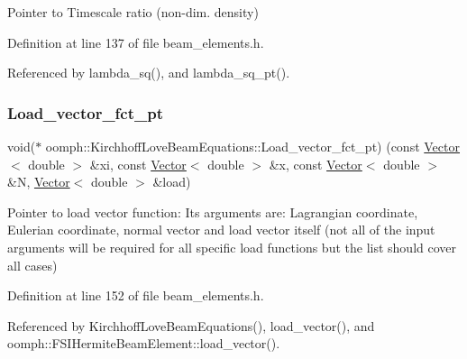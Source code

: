 Pointer to Timescale ratio (non-\/dim. density) 



Definition at line 137 of file beam\+\_\+elements.\+h.



Referenced by lambda\+\_\+sq(), and lambda\+\_\+sq\+\_\+pt().

\mbox{\label{classoomph_1_1KirchhoffLoveBeamEquations_a66707c32b8a08bcf6e8ed855066f9618}} 
\subsubsection{\texorpdfstring{Load\+\_\+vector\+\_\+fct\+\_\+pt}{Load\_vector\_fct\_pt}}
{\footnotesize\ttfamily void($\ast$ oomph\+::\+Kirchhoff\+Love\+Beam\+Equations\+::\+Load\+\_\+vector\+\_\+fct\+\_\+pt) (const \hyperlink{classoomph_1_1Vector}{Vector}$<$ double $>$ \&xi, const \hyperlink{classoomph_1_1Vector}{Vector}$<$ double $>$ \&x, const \hyperlink{classoomph_1_1Vector}{Vector}$<$ double $>$ \&N, \hyperlink{classoomph_1_1Vector}{Vector}$<$ double $>$ \&load)\hspace{0.3cm}{\ttfamily [protected]}}



Pointer to load vector function\+: Its arguments are\+: Lagrangian coordinate, Eulerian coordinate, normal vector and load vector itself (not all of the input arguments will be required for all specific load functions but the list should cover all cases) 



Definition at line 152 of file beam\+\_\+elements.\+h.



Referenced by Kirchhoff\+Love\+Beam\+Equations(), load\+\_\+vector(), and oomph\+::\+F\+S\+I\+Hermite\+Beam\+Element\+::load\+\_\+vector().

\mbox{\label{classoomph_1_1KirchhoffLoveBeamEquations_a0710dd43c856aaa9c94d3112f8cba7ed}} 
